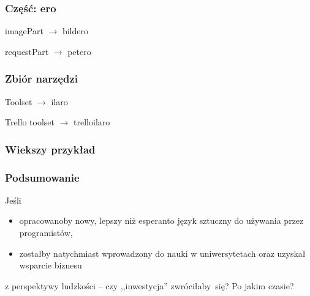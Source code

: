 \documentclass{beamer}
\begin{document}
  \begin{frame}
  	\frametitle{Część: ero}

	\begin{block}{}
		imagePart $\rightarrow$ bildero
	\end{block}
	\begin{block}{}
		requestPart $\rightarrow$ petero
	\end{block}
	
  \end{frame}
  
  \begin{frame}
  	\frametitle{Zbiór narzędzi}

	\begin{block}{}
		Toolset $\rightarrow$ ilaro
	\end{block}
	\begin{block}{}
		Trello toolset $\rightarrow$ trelloilaro
	\end{block}
  \end{frame}
  \begin{frame}
  	\frametitle{Wiekszy przykład}
  	\begin{block}{}
  		
	\end{block}
  \end{frame}
    
  \begin{frame}
  	\frametitle{Podsumowanie}
  	Jeśli 
  	\begin{itemize}
  		\item opracowanoby nowy, lepszy niż esperanto język sztuczny do używania przez programistów,
  		\item zostałby natychmiast wprowadzony do nauki w uniwersytetach oraz uzyskał wsparcie biznesu
  	\end{itemize}
  	
  	z perspektywy ludzkości -- czy ,,inwestycja'' zwróciłaby~się? Po jakim czasie?
  \end{frame}
\end{document}
